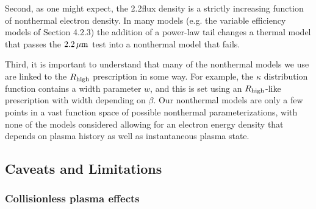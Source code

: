Second, as one might expect, the 2.2\um flux density is a strictly increasing function of nonthermal electron density.
In many models (e.g.
the variable efficiency models of Section 4.2.3) the addition of a power-law tail changes a thermal model that passes the $2.2\,\mu\mathrm{m}$ test into a nonthermal model that fails.

Third, it is important to understand that many of the nonthermal models we use are linked to the $R_\mathrm{high}$ prescription in some way.
For example, the $\kappa$ distribution function contains a width parameter $w$, and this is set using an $R_\mathrm{high}$-like prescription with width depending on $\beta$.
Our nonthermal models are only a few points in a vast function space of possible nonthermal parameterizations, with none of the models considered allowing for an electron energy density that depends on plasma history as well as instantaneous plasma state.

\subsection{Caveats and Limitations}\label{sec:limits}

\subsubsection{Collisionless plasma effects}

